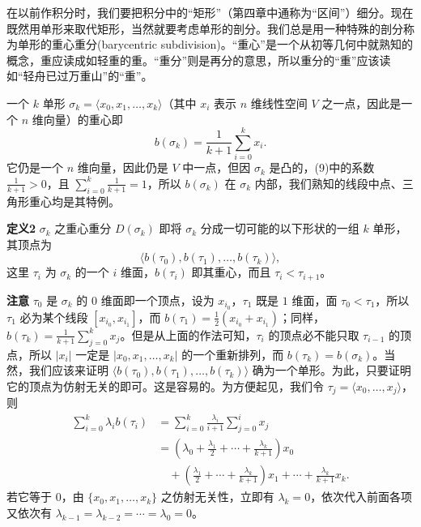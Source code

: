 在以前作积分时，我们要把积分中的“矩形”（第四章中通称为“区间”）细分。现在既然用单形来取代矩形，当然就要考虑单形的剖分。我们总是用一种特殊的剖分称为单形的重心重分(barycentric subdivision)。“重心”是一个从初等几何中就熟知的概念，重应读成如轻重的重。“重分”则是再分的意思，所以重分的“重”应该读如“轻舟已过万重山”的“重”。

一个 $k$ 单形 $\sigma_k=\langle x_0,x_1,\ldots,x_k\rangle$（其中 $x_i$ 表示 $n$ 维线性空间 $V$ 之一点，因此是一个 $n$ 维向量）的重心即
\begin{equation}
 b(\sigma_k)=\frac1{k+1}\sum_{i=0}^k x_i.
 \tag{9}
\end{equation}
它仍是一个 $n$ 维向量，因此仍是 $V$ 中一点，但因 $\sigma_k$ 是凸的，(9)中的系数 $\frac1{k+1}>0$，且 $\sum_{i=0}^k\frac1{k+1}=1$，所以 $b(\sigma_k)$ 在 $\sigma_k$ 内部，我们熟知的线段中点、三角形重心均是其特例。

\noindent\textbf{定义2}\quad
$\sigma_k$ 之重心重分 $D(\sigma_k)$ 即将 $\sigma_k$ 分成一切可能的以下形状的一组 $k$ 单形，其顶点为
\[
 \langle b(\tau_0),b(\tau_1),\ldots,b(\tau_k)\rangle,
\]
这里 $\tau_i$ 为 $\sigma_k$ 的一个 $i$ 维面，$b(\tau_i)$ 即其重心，而且 $\tau_i<\tau_{i+1}$。

\textbf{注意}\quad
$\tau_0$ 是 $\sigma_k$ 的 $0$ 维面即一个顶点，设为 $x_{i_0}$，$\tau_1$ 既是 $1$ 维面，面 $\tau_0<\tau_1$，所以 $\tau_1$ 必为某个线段 $[x_{i_0},x_{i_1}]$，而 $b(\tau_1)=\frac12(x_{i_0}+x_{i_1})$；同样，$b(\tau_k)=\frac1{k+1}\sum_{j=0}^k x_j$。但是从上面的作法可知，$\tau_i$ 的顶点必不能只取 $\tau_{i-1}$ 的顶点，所以 $|x_i|$ 一定是 $|x_0,x_1,\ldots,x_k|$ 的一个重新排列，而 $b(\tau_k)=b(\sigma_k)$。当然，我们应该来证明 $\langle b(\tau_0),b(\tau_1),\ldots,b(\tau_k)\rangle$ 确为一个单形。为此，只要证明它的顶点为仿射无关的即可。这是容易的。为方便起见，我们令 $\tau_j=\langle x_0,\ldots,x_j\rangle$，则
\begin{align*}
 \sum_{i=0}^k\lambda_i b(\tau_i)
 &=\sum_{i=0}^k\frac{\lambda_i}{i+1}\sum_{j=0}^i x_j\\
 &=\left(\lambda_0+\frac{\lambda_1}{2}+\cdots+\frac{\lambda_k}{k+1}\right)x_0\\
 &\quad+\left(\frac{\lambda_1}{2}+\cdots+\frac{\lambda_k}{k+1}\right)x_1
 +\cdots+\frac{\lambda_k}{k+1}x_k.
\end{align*}
若它等于 $0$，由 $\{x_0,x_1,\ldots,x_k\}$ 之仿射无关性，立即有 $\lambda_k=0$，依次代入前面各项又依次有 $\lambda_{k-1}=\lambda_{k-2}=\cdots=\lambda_0=0$。


